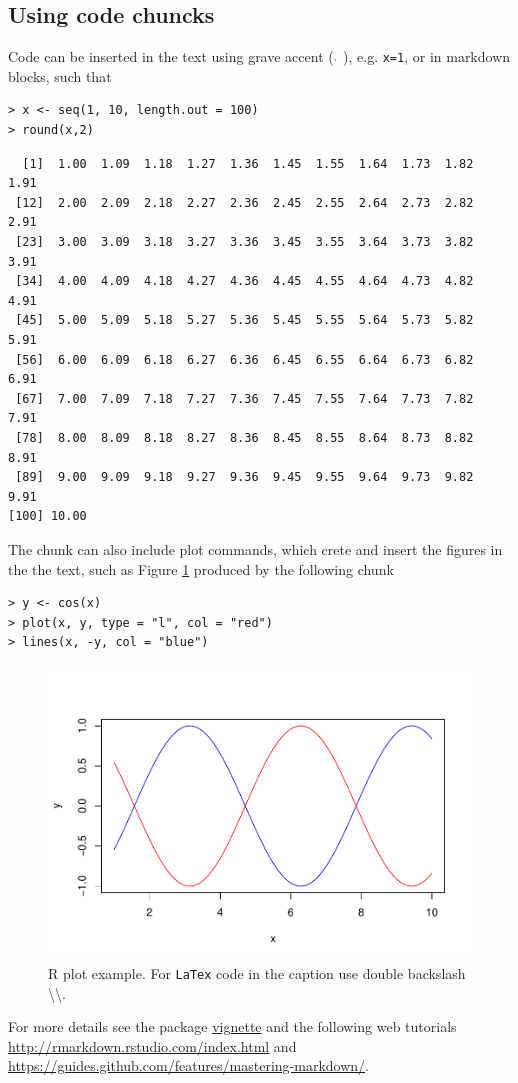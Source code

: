 \documentclass[11pt]{./config/iiir}
\let\proglang=\textsf
\let\code=\texttt
\begin{document}
\subsection{Using code chuncks}\label{using-code-chuncks}

Code can be inserted in the text using grave accent ( \(\grave{}\) ),
e.g. \texttt{x=1}, or in markdown blocks, such that

\begin{verbatim}
> x <- seq(1, 10, length.out = 100)
> round(x,2)
\end{verbatim}

\begin{verbatim}
  [1]  1.00  1.09  1.18  1.27  1.36  1.45  1.55  1.64  1.73  1.82  1.91
 [12]  2.00  2.09  2.18  2.27  2.36  2.45  2.55  2.64  2.73  2.82  2.91
 [23]  3.00  3.09  3.18  3.27  3.36  3.45  3.55  3.64  3.73  3.82  3.91
 [34]  4.00  4.09  4.18  4.27  4.36  4.45  4.55  4.64  4.73  4.82  4.91
 [45]  5.00  5.09  5.18  5.27  5.36  5.45  5.55  5.64  5.73  5.82  5.91
 [56]  6.00  6.09  6.18  6.27  6.36  6.45  6.55  6.64  6.73  6.82  6.91
 [67]  7.00  7.09  7.18  7.27  7.36  7.45  7.55  7.64  7.73  7.82  7.91
 [78]  8.00  8.09  8.18  8.27  8.36  8.45  8.55  8.64  8.73  8.82  8.91
 [89]  9.00  9.09  9.18  9.27  9.36  9.45  9.55  9.64  9.73  9.82  9.91
[100] 10.00
\end{verbatim}

The chunk can also include plot commands, which crete and insert the
figures in the the text, such as Figure \ref{fig:simple-r-plot} produced
by the following chunk

\begin{verbatim}
> y <- cos(x)
> plot(x, y, type = "l", col = "red")
> lines(x, -y, col = "blue")
\end{verbatim}

\begin{figure}[ht]

{\centering \includegraphics{yssp_report_Hadi_files/figure-latex/simple-r-plot-1} 

}

\caption{\proglang{R} plot example. For \code{LaTex} code in the caption use double backslash \textbackslash\textbackslash.}\label{fig:simple-r-plot}
\end{figure}

For more details see the package
\href{./inst/doc/iiasaRmarkdown.pdf}{vignette} and the following web
tutorials \url{http://rmarkdown.rstudio.com/index.html} and
\url{https://guides.github.com/features/mastering-markdown/}.




\end{document}
